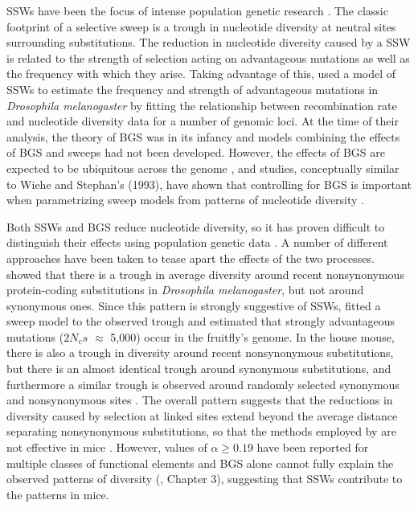 	SSWs have been the focus of intense population genetic research \citep{RN124, RN235, RN278, RN226}. The classic footprint of a selective sweep is a trough in nucleotide diversity at neutral sites surrounding substitutions. The reduction in nucleotide diversity caused by a SSW is related to the strength of selection acting on advantageous mutations as well as the frequency with which they arise. Taking advantage of this, \cite{RN277} used a model of SSWs to estimate the frequency and strength of advantageous mutations in \textit{Drosophila melanogaster} by fitting the relationship between recombination rate and nucleotide diversity data for a number of genomic loci. At the time of their analysis, the theory of BGS was in its infancy and models combining the effects of BGS and sweeps had not been developed. However, the effects of BGS are expected to be ubiquitous across the genome \citep{RN120, RN116, RN274}, and studies, conceptually similar to Wiehe and Stephan's (1993), have shown that controlling for BGS is important when parametrizing sweep models from patterns of nucleotide diversity \citep{RN116, RN274, RN290}.

	Both SSWs and BGS reduce nucleotide diversity, so it has proven difficult to distinguish their effects using population genetic data \citep{RN339}. A number of different approaches have been taken to tease apart the effects of the two processes. \cite{RN167} showed that there is a trough in average diversity around recent nonsynonymous protein-coding substitutions in \textit{Drosophila melanogaster}, but not around synonymous ones. Since this pattern is strongly suggestive of SSWs, \cite{RN167} fitted a sweep model to the observed trough and estimated that strongly advantageous mutations ($2N_es$ $\approx$ 5,000) occur in the fruitfly's genome.  In the house mouse, there is also a trough in diversity around recent nonsynonymous substitutions, but there is an almost identical trough around synonymous substitutions, and furthermore a similar trough is observed around  randomly selected synonymous and nonsynonymous sites \citep{RN122}. The overall pattern suggests that the reductions in diversity caused by selection at linked sites extend beyond the average distance separating nonsynonymous substitutions, so that the methods employed by \cite{RN167} are not effective in mice \citep{RN122}. However, values of $\alpha \geq 0.19$ have been reported for  multiple classes of functional elements \citep{RN122} and BGS alone cannot fully explain the observed patterns of diversity (\citealt{RN122}, Chapter 3), suggesting that SSWs contribute to the patterns in mice.



